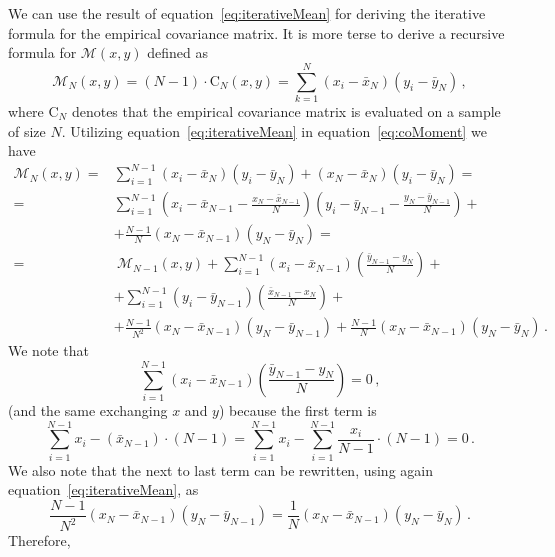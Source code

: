 \documentclass[10pt,a4paper]{report}
\begin{document}
We can use the result of equation~\ref{eq:iterativeMean} for deriving the iterative formula for the empirical covariance matrix. It is more terse to derive a recursive formula for $\mathcal{M}(x,y)$ defined as
\begin{equation}
\mathcal{M}_N(x,y) = (N-1)\cdot\mbox{C}_N(x,y) = \sum\limits_{k=1}^N (x_i - \bar{x}_N)(y_i - \bar{y}_N)\, ,
\label{eq:coMoment}
\end{equation}
where $\mbox{C}_N$ denotes that the empirical covariance matrix is evaluated on a sample of size $N$. Utilizing equation~\ref{eq:iterativeMean} in equation~\ref{eq:coMoment} we have
\begin{equation}
\begin{aligned}
\mathcal{M}_N(x,y) =& \sum\limits_{i=1}^{N-1}(x_i - \bar{x}_N)(y_i - \bar{y}_N) + (x_N - \bar{x}_N)(y_i - \bar{y}_N) = \\
=& \sum\limits_{i=1}^{N-1}\left(x_i - \bar{x}_{N-1} - \frac{x_N - \bar{x}_{N-1}}{N}\right)\left(y_i - \bar{y}_{N-1} - \frac{y_N - \bar{y}_{N-1}}{N}\right) +\\
&+ \frac{N-1}{N}(x_N - \bar{x}_{N-1})(y_N - \bar{y}_N) = \\
=& \ \mathcal{M}_{N-1}(x,y) + \sum\limits_{i=1}^{N-1}(x_i-\bar{x}_{N-1})\left(\frac{\bar{y}_{N-1} - y_N}{N}\right) +\\
&+ \sum\limits_{i=1}^{N-1}(y_i-\bar{y}_{N-1})\left(\frac{\bar{x}_{N-1} - x_N}{N}\right) +\\
&+ \frac{N-1}{N^2}(x_N - \bar{x}_{N-1})(y_N - \bar{y}_{N-1}) + \frac{N-1}{N}(x_N - \bar{x}_{N-1})(y_N - \bar{y}_N) \, .
\end{aligned}
\end{equation}
We note that
\begin{equation}
\sum\limits_{i=1}^{N-1}(x_i-\bar{x}_{N-1})\left(\frac{\bar{y}_{N-1} - y_N}{N}\right) = 0\, ,
\end{equation}
(and the same exchanging $x$ and $y$) because the first term is
\begin{equation}
\sum\limits_{i=1}^{N-1}x_i - (\bar{x}_{N-1})\cdot(N-1) = \sum\limits_{i=1}^{N-1}x_i - \sum\limits_{i=1}^{N-1}\frac{x_i}{N-1}\cdot(N-1) = 0 \, .
\end{equation}
We also note that the next to last term can be rewritten, using again equation~\ref{eq:iterativeMean}, as
\begin{equation}
\frac{N-1}{N^2}(x_N - \bar{x}_{N-1})(y_N - \bar{y}_{N-1}) = \frac1N(x_N - \bar{x}_{N-1})(y_N - \bar{y}_N)\, .
\end{equation}
Therefore,
\end{document}
